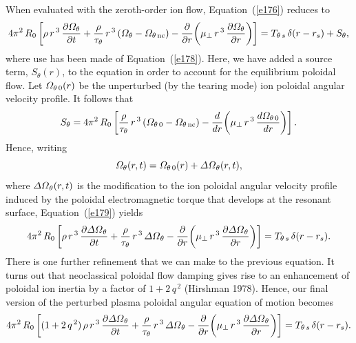 \documentclass[notitlepage,12pt]{article}
\begin{document}
When evaluated with the zeroth-order ion flow, Equation~(\ref{e176}) reduces to 
\begin{equation}\label{e179}
4\pi^2\,R_0\left[\rho\,r^{\,3}\,\frac{\partial {\mit\Omega}_\theta}{\partial t}+ \frac{\rho}{\tau_\theta}\,r^{\,3}\,({\mit\Omega}_\theta-{\mit\Omega}_{\theta\,{\rm nc}}) -\frac{\partial}{\partial r}\!\left(\mu_\perp\,r^{\,3}\,\frac{\partial{\mit\Omega}_\theta}{\partial r}\right)\right]
=T_{\theta\,s}\,\delta(r-r_s)+ S_\theta,
\end{equation}
where use has been made of Equation~(\ref{e178}). 
Here, we have added a source term, $S_\theta(r)$, to the equation in order to account for the equilibrium poloidal flow. Let ${\mit\Omega}_{\theta\,0}(r)$ be the 
unperturbed (by the tearing mode) ion poloidal angular velocity profile. It follows that 
\begin{equation}
S_\theta = 4\pi^2\,R_0\left[ \frac{\rho}{\tau_\theta}\,r^{\,3}\,({\mit\Omega}_{\theta\,0}-{\mit\Omega}_{\theta\,{\rm nc}}) -\frac{d}{d r}\!\left(\mu_\perp\,r^{\,3}\,\frac{d{\mit\Omega}_{\theta\,0}}{d r}\right)\right].
\end{equation}
Hence, writing
\begin{equation}
{\mit\Omega}_\theta(r,t)= {\mit\Omega}_{\theta\,0}(r) + {\mit\Delta\Omega}_\theta(r,t),
\end{equation}
where ${\mit\Delta\Omega}_{\theta}(r,t)$ is the  modification to the ion poloidal angular velocity profile
induced by the poloidal electromagnetic torque that develops at the resonant surface, Equation~(\ref{e179})
yields 
\begin{equation}
4\pi^2\,R_0\left[\rho\,r^{\,3}\,\frac{\partial {\mit\Delta\Omega}_\theta}{\partial t}+ \frac{\rho}{\tau_\theta}\,r^{\,3}\,{\mit\Delta\Omega}_\theta-\frac{\partial}{\partial r}\!\left(\mu_\perp\,r^{\,3}\,\frac{\partial{\mit\Delta\Omega}_\theta}{\partial r}\right)\right]
=T_{\theta\,s}\,\delta(r-r_s).
\end{equation}
There is one further refinement that we can make to the previous equation. It turns out that neoclassical poloidal
flow damping gives rise to an enhancement of poloidal ion inertia by a factor of $1+2\,q^{\,2}$ (Hirshman 1978). Hence,
our final version of the perturbed plasma poloidal angular equation of motion becomes 
\begin{equation}\label{e182}
4\pi^2\,R_0\left[(1+2\,q^{\,2})\,\rho\,r^{\,3}\,\frac{\partial {\mit\Delta\Omega}_\theta}{\partial t}+ \frac{\rho}{\tau_\theta}\,r^{\,3}\,{\mit\Delta\Omega}_\theta-\frac{\partial}{\partial r}\!\left(\mu_\perp\,r^{\,3}\,\frac{\partial{\mit\Delta\Omega}_\theta}{\partial r}\right)\right]
=T_{\theta\,s}\,\delta(r-r_s).
\end{equation}
\end{document}
